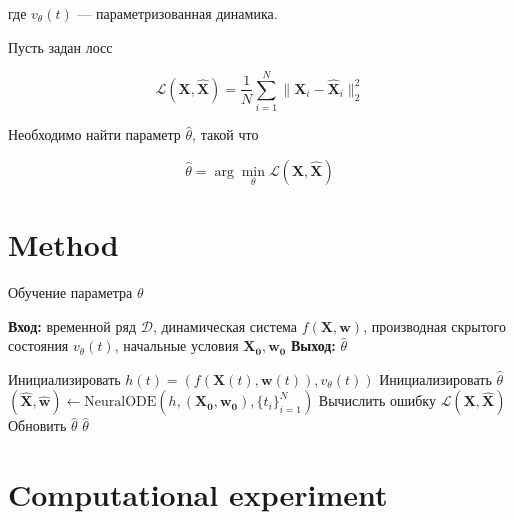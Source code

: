 \documentclass[a4paper,14pt]{article}
\theoremstyle{plain} %
\theoremstyle{definition} %
\theoremstyle{remark} %
\begin{document}
        где \( v_\theta(t) \) — параметризованная динамика.
        
        Пусть задан лосс
        
        \begin{equation}
        \mathcal{L}(\mathbf{X}, \widehat{\mathbf{X}}) = \frac{1}{N} \sum_{i=1}^{N} \| \mathbf{X}_i - \widehat{\mathbf{X}}_i \|_2^2
        \end{equation}
        
        Необходимо найти параметр \( \widehat{\theta} \), такой что
        
        \begin{equation}
        \widehat{\theta} = \arg\min_{\theta} \mathcal{L}(\mathbf{X}, \widehat{\mathbf{X}})
        \end{equation}

        \section{Method}

        \begin{algorithm}[H]
        \caption{Обучение параметра \( \theta \)}
        \begin{algorithmic}[1]
        \STATE \textbf{Вход:} временной ряд \( \mathcal{D} \), динамическая система \( f(\mathbf{X}, \mathbf{w}) \), производная скрытого состояния \( v_\theta(t)\), начальные условия \( \mathbf{X_0}, \mathbf{w_0} \)
        \STATE \textbf{Выход:} \( \widehat{\theta} \)
        
        \STATE Инициализировать \( h(t) = (f(\mathbf{X}(t), \mathbf{w}(t)), v_\theta(t)) \)
        \STATE Инициализировать \(\widehat{\theta}\)
                \STATE \( (\widehat{\mathbf{X}}, \widehat{\mathbf{w}} ) \gets \mathrm{NeuralODE}(h, (\mathbf{X_0}, \mathbf{w_0}), \{ t_i \}_{i=1}^N) \)
                \STATE Вычислить ошибку \( \mathcal{L}(\mathbf{X}, \widehat{\mathbf{X}}) \)
                \STATE Обновить $\widehat{\theta}$
            \ENDFOR
        \ENDFOR
        \RETURN $\widehat\theta$
        
        \end{algorithmic}
        \end{algorithm}

        \section{Computational experiment}
\end{document}

